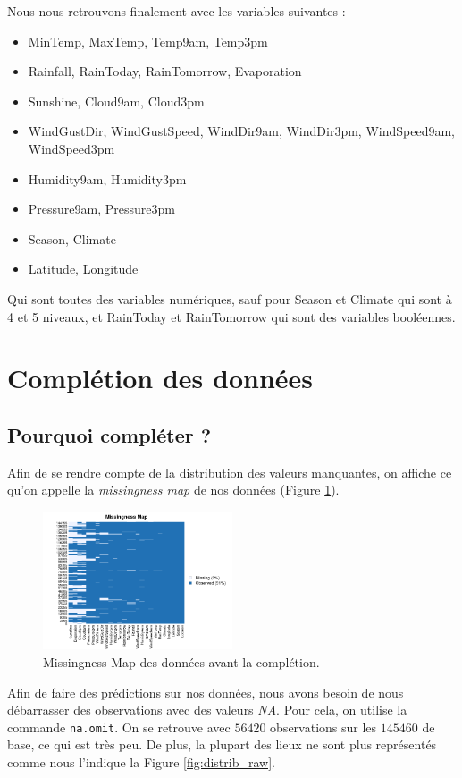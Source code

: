 \documentclass{article}
\begin{document}
Nous nous retrouvons finalement avec les variables suivantes : 
\begin{itemize}
    \item MinTemp, MaxTemp, Temp9am, Temp3pm
    \item Rainfall, RainToday, RainTomorrow, Evaporation
    \item Sunshine, Cloud9am, Cloud3pm
    \item WindGustDir, WindGustSpeed, WindDir9am, WindDir3pm, WindSpeed9am, WindSpeed3pm
    \item Humidity9am, Humidity3pm
    \item Pressure9am, Pressure3pm
    \item Season, Climate
    \item Latitude, Longitude
\end{itemize}
Qui sont toutes des variables numériques, sauf pour Season et Climate qui sont à 4 et 5 niveaux, et RainToday et RainTomorrow qui sont des variables booléennes.

\section{Complétion des données}

\subsection{Pourquoi compléter ?}

Afin de se rendre compte de la distribution des valeurs manquantes, on affiche ce qu'on appelle la \emph{missingness map} de nos données (Figure \ref{fig:missingness_raw}).

\begin{figure}[htp]
    \centering
    \includegraphics[width=0.5\textwidth]{Images/missmap.png}
    \caption{Missingness Map des données avant la complétion.}
    \label{fig:missingness_raw}
\end{figure}

Afin de faire des prédictions sur nos données, nous avons besoin de nous débarrasser des observations avec des valeurs \emph{NA}. Pour cela, on utilise la commande \texttt{na.omit}. On se retrouve avec $56420$ observations sur les $145460$ de base, ce qui est très peu. De plus, la plupart des lieux ne sont plus représentés comme nous l'indique la Figure \ref{fig:distrib_raw}.
\end{document}
